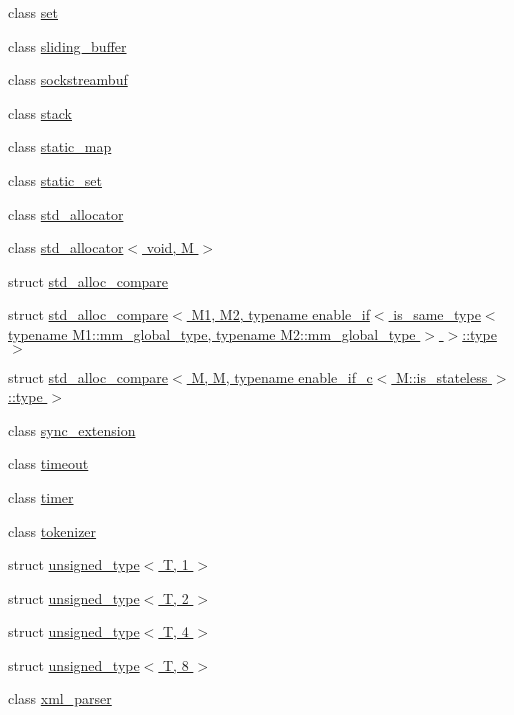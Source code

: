 \begin{DoxyCompactItemize}
\item 
class \hyperlink{classdlib_1_1set}{set}
\item 
class \hyperlink{classdlib_1_1sliding__buffer}{sliding\_\-buffer}
\item 
class \hyperlink{classdlib_1_1sockstreambuf}{sockstreambuf}
\item 
class \hyperlink{classdlib_1_1stack}{stack}
\item 
class \hyperlink{classdlib_1_1static__map}{static\_\-map}
\item 
class \hyperlink{classdlib_1_1static__set}{static\_\-set}
\item 
class \hyperlink{classdlib_1_1std__allocator}{std\_\-allocator}
\item 
class \hyperlink{classdlib_1_1std__allocator_3_01void_00_01M_01_4}{std\_\-allocator$<$ void, M $>$}
\item 
struct \hyperlink{structdlib_1_1std__alloc__compare}{std\_\-alloc\_\-compare}
\item 
struct \hyperlink{structdlib_1_1std__alloc__compare_3_01M1_00_01M2_00_01typename_01enable__if_3_01is__same__type_3982ed367adf685c0833f1e72cac3711f}{std\_\-alloc\_\-compare$<$ M1, M2, typename enable\_\-if$<$ is\_\-same\_\-type$<$ typename M1::mm\_\-global\_\-type, typename M2::mm\_\-global\_\-type $>$ $>$::type $>$}
\item 
struct \hyperlink{structdlib_1_1std__alloc__compare_3_01M_00_01M_00_01typename_01enable__if__c_3_01M_1_1is__stateless_01_4_1_1type_01_4}{std\_\-alloc\_\-compare$<$ M, M, typename enable\_\-if\_\-c$<$ M::is\_\-stateless $>$::type $>$}
\item 
class \hyperlink{classdlib_1_1sync__extension}{sync\_\-extension}
\item 
class \hyperlink{classdlib_1_1timeout}{timeout}
\item 
class \hyperlink{classdlib_1_1timer}{timer}
\item 
class \hyperlink{classdlib_1_1tokenizer}{tokenizer}
\item 
struct \hyperlink{structdlib_1_1unsigned__type_3_01T_00_011_01_4}{unsigned\_\-type$<$ T, 1 $>$}
\item 
struct \hyperlink{structdlib_1_1unsigned__type_3_01T_00_012_01_4}{unsigned\_\-type$<$ T, 2 $>$}
\item 
struct \hyperlink{structdlib_1_1unsigned__type_3_01T_00_014_01_4}{unsigned\_\-type$<$ T, 4 $>$}
\item 
struct \hyperlink{structdlib_1_1unsigned__type_3_01T_00_018_01_4}{unsigned\_\-type$<$ T, 8 $>$}
\item 
class \hyperlink{classdlib_1_1xml__parser}{xml\_\-parser}
\end{DoxyCompactItemize}
